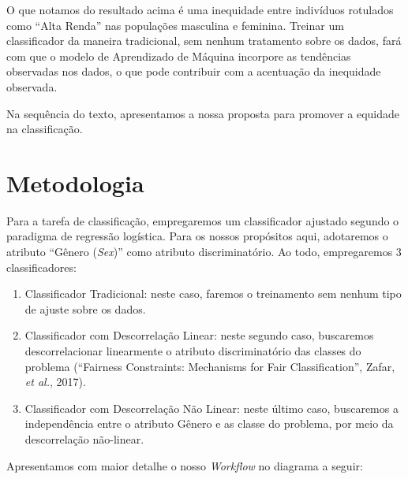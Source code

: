 \documentclass[11pt]{article}
\begin{document}
    O que notamos do resultado acima é uma inequidade entre indivíduos
rotulados como ``Alta Renda'' nas populações masculina e feminina.
Treinar um classificador da maneira tradicional, sem nenhum tratamento
sobre os dados, fará com que o modelo de Aprendizado de Máquina
incorpore as tendências observadas nos dados, o que pode contribuir com
a acentuação da inequidade observada.

Na sequência do texto, apresentamos a nossa proposta para promover a
equidade na classificação.

    \hypertarget{metodologia}{%
\section{Metodologia}\label{metodologia}}

Para a tarefa de classificação, empregaremos um classificador ajustado
segundo o paradigma de regressão logística. Para os nossos propósitos
aqui, adotaremos o atributo ``Gênero (\emph{Sex})'' como atributo
discriminatório. Ao todo, empregaremos 3 classificadores:

\begin{enumerate}
\def\labelenumi{\arabic{enumi})}
\item
  Classificador Tradicional: neste caso, faremos o treinamento sem
  nenhum tipo de ajuste sobre os dados.
\item
  Classificador com Descorrelação Linear: neste segundo caso, buscaremos
  descorrelacionar linearmente o atributo discriminatório das classes do
  problema (``Fairness Constraints: Mechanisms for Fair
  Classification'', Zafar, \emph{et al.}, 2017).
\item
  Classificador com Descorrelação Não Linear: neste último caso,
  buscaremos a independência entre o atributo Gênero e as classe do
  problema, por meio da descorrelação não-linear.
\end{enumerate}

Apresentamos com maior detalhe o nosso \emph{Workflow} no diagrama a
seguir:
\end{document}
